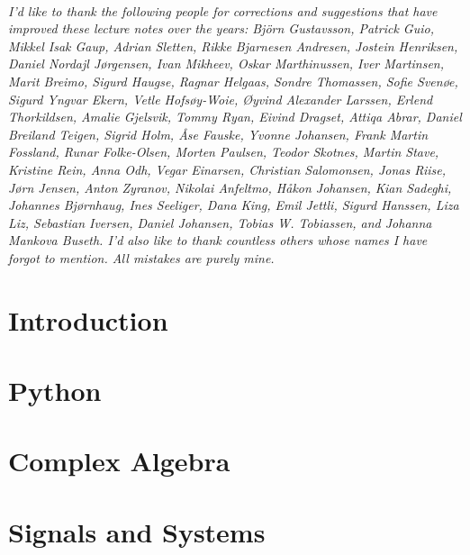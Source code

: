 \documentclass{tufte-book}
\begin{document}
\cleardoublepage
~\vfill
\begin{doublespace}
\noindent\fontsize{10}{10}\selectfont\itshape
\nohyphenation
I'd like to thank the following people for corrections and suggestions
that have improved these lecture notes over the years: Björn
Gustavsson, Patrick Guio,
Mikkel Isak Gaup, Adrian Sletten,
Rikke Bjarnesen Andresen, Jostein Henriksen, Daniel Nordajl Jørgensen,
Ivan Mikheev, Oskar Marthinussen, Iver Martinsen, Marit Breimo, Sigurd
Haugse, Ragnar Helgaas, Sondre Thomassen, Sofie Svenøe, Sigurd Yngvar
Ekern, Vetle Hofsøy-Woie, Øyvind Alexander Larssen, Erlend
Thorkildsen, Amalie Gjelsvik, Tommy Ryan, Eivind Dragset, Attiqa
Abrar, Daniel Breiland Teigen, Sigrid Holm, Åse Fauske, Yvonne
Johansen, Frank Martin Fossland, Runar Folke-Olsen, Morten Paulsen,
Teodor Skotnes,
Martin Stave, Kristine Rein, Anna Odh, Vegar
Einarsen, Christian Salomonsen, Jonas Riise, Jørn Jensen, Anton
Zyranov, Nikolai Anfeltmo, Håkon Johansen, Kian Sadeghi, Johannes
Bjørnhaug, Ines Seeliger, Dana King, Emil Jettli, Sigurd Hanssen, Liza
Liz, Sebastian Iversen, Daniel Johansen, Tobias W. Tobiassen, and
Johanna Mankova Buseth. I'd also like to thank countless others whose
names I have forgot to mention. All mistakes are purely mine.
\end{doublespace}
\vfill
\vfill





\cleardoublepage


\ifSpIntro
  \chapter{Introduction}
  
\fi

\ifSpPython
\chapter{Python} 


\fi

\ifSpComplex
\chapter{Complex Algebra}


\fi

\ifSpSigSys
\chapter{Signals and Systems}


\fi
\end{document}
